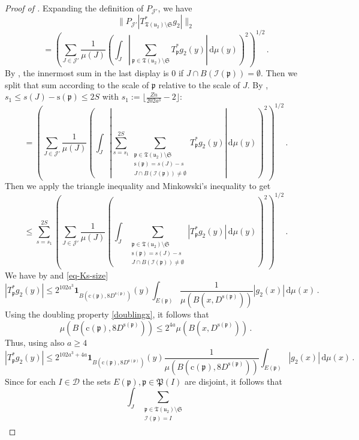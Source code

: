 \documentclass[10pt,a4paper]{article}
\theoremstyle{plain}
\theoremstyle{definition}
\numberwithin{equation}{subsection}
\newcommand{\fp}{{\mathfrak p}}
\newcommand{\fP}{{\mathfrak P}}
\newcommand{\fu}{{\mathfrak u}}
\newcommand{\fT}{{\mathfrak T}}
\newcommand{\pc}{{\mathrm{c}}}
\newcommand{\ps}{{\mathrm{s}}}
\newcommand{\scI}{{\mathcal{I}}} %
\newcommand{\proves}[1]{}
\newcommand{\leanok}{}
\begin{document}
\begin{proof}[Proof of ]
    \leanok
    \proves{bound-for-tree-projection}
    Expanding the definition of $P_{\mathcal{J}'}$, we have
    $$
        \|P_{\mathcal{J}'}|T_{\fT(\fu_2) \setminus \mathfrak{S}}^* g_2|\|_2
    $$
    $$
        = \left(\sum_{J \in \mathcal{J}'} \frac{1}{\mu(J)} \left(\int_J \left| \sum_{\fp \in \fT(\fu_2) \setminus \mathfrak{S}} T_{\fp}^* g_2(y) \right| \, \mathrm{d}\mu(y) \right)^2 \right)^{1/2}\,.
    $$
    By , the innermost sum in the last display is $0$ if $J \cap B(\scI(\fp)) = \emptyset$.
    Then we split that sum according to the scale of $\fp$ relative to the scale of $J$.
    By , $s_1 \le s(J) - \ps(\fp) \le 2S$ with $s_1 := \lfloor\frac{Zn}{202a^3} - 2\rfloor$:
    $$
        = \left(\sum_{J \in \mathcal{J}'} \frac{1}{\mu(J)} \left(\int_J \left| \sum_{s=s_1}^{2S} \sum_{\substack{\fp \in \fT(\fu_2) \setminus \mathfrak{S}\\ \ps(\fp) = s(J) - s\\
        J \cap B(\scI(\fp)) \ne \emptyset}} T_{\fp}^* g_2(y) \right| \, \mathrm{d}\mu(y) \right)^2 \right)^{1/2}\,.
    $$
    Then we apply the triangle inequality and Minkowski's inequality to get
    \begin{equation}
    \label{eq-sep-tree-small-1}
        \le \sum_{s=s_1}^{2S} \left( \sum_{J \in \mathcal{J}'} \frac{1}{\mu(J)} \left(\int_J \sum_{\substack{\fp \in \fT(\fu_2) \setminus \mathfrak{S}\\ \ps(\fp) = s(J) - s\\
        J \cap B(\scI(\fp)) \ne \emptyset}} |T_{\fp}^* g_2(y)| \, \mathrm{d}\mu(y) \right)^2\right)^{1/2}\,.
    \end{equation}
    We have by  and \eqref{eq-Ks-size}
    $$
        |T_{\fp}^* g_2(y)| \le 2^{102a^3} \mathbf{1}_{B(\pc(\fp), 8D^{\ps(\fp)})}(y) \int_{E(\fp)} \frac{1}{\mu(B(x, D^{\ps(\fp)}))} |g_2(x)| \, \mathrm{d}\mu(x)\,.
    $$
    Using the doubling property \eqref{doublingx}, it follows that
    $$
        \mu(B(\pc(\fp), 8D^{\ps(\fp)})) \le 2^{4a} \mu(B(x, D^{\ps(\fp)}))\,.
    $$
    Thus, using also $a \ge 4$
    $$
        |T_{\fp}^* g_2(y)| \le 2^{102a^3+4a} \mathbf{1}_{B(\pc(\fp), 8D^{\ps(\fp)})}(y) \frac{1}{\mu(B(\pc(\fp), 8D^{\ps(\fp)}))} \int_{E(\fp)} |g_2(x)| \, \mathrm{d}\mu(x)\,.
    $$
    Since for each $I \in \mathcal{D}$ the sets $E(\fp), \fp \in \fP(I)$ are disjoint, it follows that
    $$
        \int_J \sum_{\substack{\fp \in \fT(\fu_2) \setminus \mathfrak{S}\\ \scI(\fp) = I\\
}}$$
\end{proof}
\end{document}
